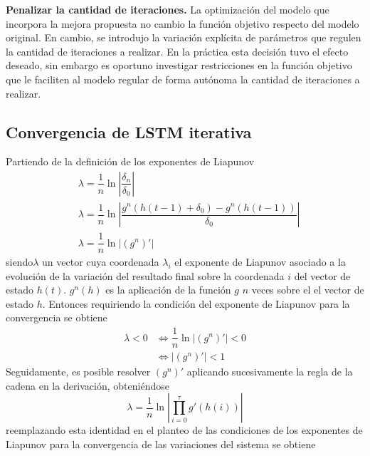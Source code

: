 \documentclass{article}
\begin{document}
	\textbf{Penalizar la cantidad de iteraciones.} La optimización del modelo que incorpora la mejora propuesta no cambio la función objetivo respecto del modelo original. En cambio, se introdujo la variación explícita de parámetros que regulen la cantidad de iteraciones a realizar. En la práctica esta decisión tuvo el efecto deseado, sin embargo es oportuno investigar restricciones en la función objetivo que le faciliten al modelo regular de forma autónoma la cantidad de iteraciones a realizar.
	
	\pagebreak
	\appendix
	\begin{appendices}
		\section{Convergencia de LSTM iterativa} \label{iterativeLSTMconvergence}
		Partiendo de la definición de los exponentes de Liapunov
		\begin{equation*}
		\begin{split}
		&\lambda = \dfrac{1}{n} \ln\left\lvert\dfrac{\delta_n}{\delta_0}\right\rvert\\
		&\lambda = \dfrac{1}{n} \ln \left\lvert \dfrac{g^n(h(t-1) + \delta_0) - g^n(h(t-1))}{\delta_0} \right\rvert\\
		&\lambda = \dfrac{1}{n} \ln | (g^n)' |
		\end{split}
		\end{equation*}
		siendo$\lambda$ un vector cuya coordenada $\lambda_i$ el exponente de Liapunov asociado a la evolución de la variación del resultado final sobre la coordenada $i$ del vector de estado $h(t)$. $g^n(h)$ es la aplicación de la función $g$ $n$ veces sobre el el vector de estado $h$. Entonces requiriendo la condición del exponente de Liapunov para la convergencia se obtiene
		\begin{equation*}
		\begin{split}
		\lambda < 0 &\iff \dfrac{1}{n} \ln | (g^n)' | < 0\\
		&\iff | (g^n)' | < 1
		\end{split}
		\end{equation*}
		Seguidamente, es posible resolver $(g^n)'$ aplicando sucesivamente la regla de la cadena en la derivación, obteniéndose
		\begin{equation*}
		\lambda = \dfrac{1}{n} \ln \left\lvert  \prod_{i = 0}^{\tau}g'(h(i)) \right\rvert 
		\end{equation*}
		reemplazando esta identidad en el planteo de las condiciones de los exponentes de Liapunov para la convergencia de las variaciones del sistema se obtiene

\end{appendices}
\end{document}
